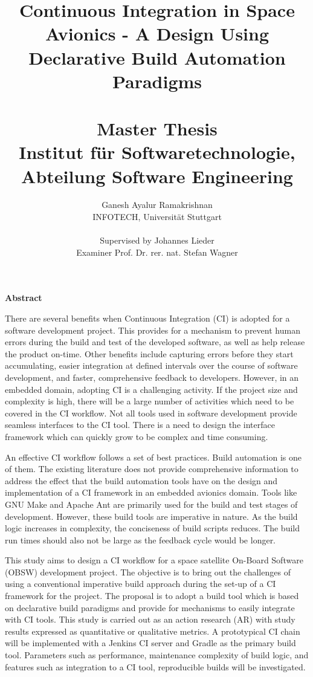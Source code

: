 \documentclass[12pt, a4paper, titlepage]{scrartcl}
\title{Continuous Integration in Space Avionics - A Design Using Declarative Build Automation Paradigms\\
\ \\
{\large Master Thesis \\
	Institut für Softwaretechnologie, \\
	Abteilung Software Engineering
\\
}
}
\author{Ganesh Ayalur Ramakrishnan  \\
  INFOTECH, Universität Stuttgart  \\
  \\
  Supervised by Johannes Lieder \\
  Examiner Prof. Dr. rer. nat. Stefan Wagner
}
\begin{document}
\maketitle

\textbf{Abstract}
\par There are several benefits when Continuous Integration (CI) is adopted for a software
development project. This provides for a mechanism to prevent human errors during
the build and test of the developed software, as well as help release the product on-time.
Other benefits include capturing errors before they start accumulating, easier integration
at defined intervals over the course of software development, and faster, comprehensive
feedback to developers. However, in an embedded domain, adopting CI is a challenging activity. If the project size and complexity is high, there will be a large number of activities which need to be covered in the CI workflow. Not all tools used in software development provide seamless interfaces to the CI tool. There is a need to design the interface framework which can quickly grow to be complex and time consuming. 
\par An effective CI workflow follows a set of best practices. Build automation is one of them. The existing literature does not provide comprehensive information to address the effect that the build
automation tools have on the design and implementation of a CI framework in an embedded
avionics domain. Tools like GNU Make and Apache Ant are primarily used for the build and
test stages of development. However, these build tools are imperative in nature. As the build logic increases in complexity, the conciseness of build scripts reduces. The build run times should also not be large as the feedback cycle would be longer. 
\par This study aims to design a CI workflow for a space satellite On-Board Software (OBSW) development
project. The objective is to bring out the challenges of using a conventional imperative
build approach during the set-up of a CI framework for the project. The proposal
is to adopt a build tool which is based on declarative build paradigms and provide
for mechanisms to easily integrate with CI tools. This study is carried out as an action research
(AR) with study results expressed as quantitative or qualitative metrics. A prototypical CI chain will be implemented
with a Jenkins CI server and Gradle as the primary build tool. Parameters such as performance, maintenance complexity of build logic, and features such as integration to a CI tool, reproducible builds will be investigated. 
\end{document}
